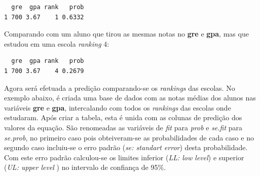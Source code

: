 \documentclass[12pt,brazil,oneside]{book}
\newenvironment{Shaded}{\begin{snugshade}}{\end{snugshade}}
\newcommand{\DataTypeTok}[1]{\textcolor[rgb]{0.13,0.29,0.53}{#1}}
\newcommand{\DecValTok}[1]{\textcolor[rgb]{0.00,0.00,0.81}{#1}}
\newcommand{\FloatTok}[1]{\textcolor[rgb]{0.00,0.00,0.81}{#1}}
\newcommand{\KeywordTok}[1]{\textcolor[rgb]{0.13,0.29,0.53}{\textbf{#1}}}
\newcommand{\NormalTok}[1]{#1}
\newcommand{\OperatorTok}[1]{\textcolor[rgb]{0.81,0.36,0.00}{\textbf{#1}}}
\newcommand{\StringTok}[1]{\textcolor[rgb]{0.31,0.60,0.02}{#1}}
\begin{document}
\begin{verbatim}
  gre  gpa rank   prob
1 700 3.67    1 0.6332
\end{verbatim}

Comparando com um aluno que tirou as mesmas notas no \textbf{gre} e \textbf{gpa}, mas que estudou em uma escola \emph{ranking} 4:

\begin{Shaded}
\end{Shaded}

\begin{verbatim}
  gre  gpa rank   prob
1 700 3.67    4 0.2679
\end{verbatim}

Agora será efetuada a predição comparando-se os \emph{rankings} das escolas. No exemplo abaixo, é criada uma base de dados com as notas médias dos alunos nas variáveis \textbf{gre} e \textbf{gpa}, intercalando com todos os \emph{rankings} das escolas onde estudaram. Após criar a tabela, esta é unida com as colunas de predição dos valores da equação. São renomeadas as variáveis de \emph{fit} para \emph{prob} e \emph{se.fit} para \emph{se.prob}, no primeiro caso pois obteiveram-se as probabilidades de cada caso e no segundo caso incluiu-se o erro padrão (\emph{se: standart error}) desta probabilidade. Com este erro padrão calculou-se os limites inferior (\emph{LL: low level}) e superior (\emph{UL: upper level }) no intervalo de confiança de 95\%.
\end{document}
